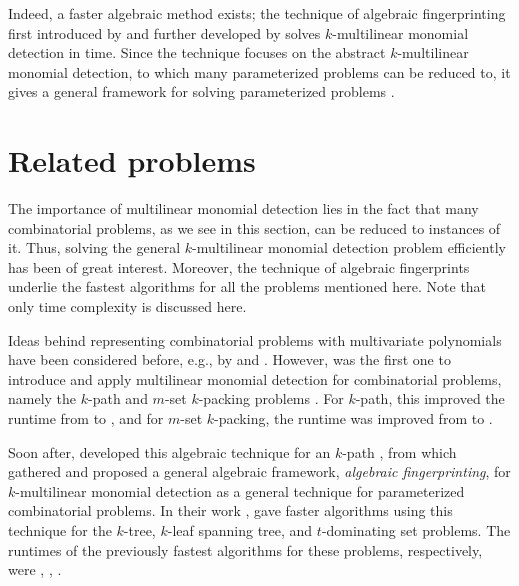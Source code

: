 Indeed, a faster algebraic method exists; the technique of algebraic fingerprinting 
first introduced by \citeauthor{Koutis08} \cite{Koutis08} and 
further developed by \citeauthor{Williams09} \cite{Williams09} 
solves $k$-multilinear monomial detection in  time. 
Since the technique focuses on the abstract $k$-multilinear monomial detection, 
to which many parameterized problems can be reduced to, 
it gives a general framework for 
solving parameterized problems \cite{KouWil15}.

\section{Related problems} %
\label{sect:related_problems}

The importance of multilinear monomial detection lies in the fact 
that many combinatorial problems, as we see in this section, 
can be reduced to instances of it. 
Thus, solving the general $k$-multilinear monomial detection problem 
efficiently has been of great interest. 
Moreover, the technique of algebraic fingerprints underlie the fastest algorithms 
for all the problems mentioned here. 
Note that only time complexity is discussed here. 

Ideas behind representing combinatorial problems with multivariate polynomials have 
been considered before, e.g., by \citeauthor{Valiant92} \cite{Valiant92} and 
\citeauthor{Koutis05} \cite{Koutis05}. However, 
\citeauthor{Koutis08} was the first one to introduce and apply multilinear monomial 
detection for combinatorial problems, namely the $k$-path and $m$-set $k$-packing problems 
\cite{Koutis08}. For $k$-path, this improved the runtime from 
 \cite{Chen07} to , and for $m$-set $k$-packing, 
the runtime was improved from  \cite{Koutis05} to .

Soon after, \citeauthor{Williams09} developed this algebraic technique 
for an  $k$-path \cite{Williams09}, 
from which \citeauthor{KouWil09} \cite{KouWil09, KouWil15} 
gathered and proposed a general 
 algebraic framework, 
\emph{algebraic fingerprinting}, for $k$-multilinear monomial detection 
as a general technique for 
parameterized combinatorial problems. In their work \cite{KouWil09}, 
\citeauthor{KouWil09} gave faster  algorithms using this technique for the 
$k$-tree, $k$-leaf spanning tree, and $t$-dominating set problems. %
The runtimes of the previously fastest algorithms for these problems, respectively, were   
 \cite{Alon95},  \cite{Kneis11},  \cite{Kneis07}. 

